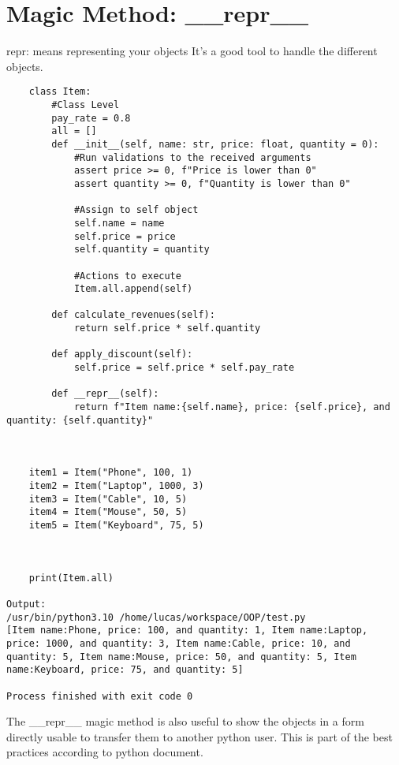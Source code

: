 \documentclass{article}
\begin{document}
\section{Magic Method: \_\_repr\_\_}
repr: means representing your objects
It's a good tool to handle the different objects.
\begin{lstlisting}
	class Item:
		#Class Level
		pay_rate = 0.8
		all = []
		def __init__(self, name: str, price: float, quantity = 0):
			#Run validations to the received arguments
			assert price >= 0, f"Price is lower than 0"
			assert quantity >= 0, f"Quantity is lower than 0"
			
			#Assign to self object
			self.name = name
			self.price = price
			self.quantity = quantity
			
			#Actions to execute
			Item.all.append(self)
			
		def calculate_revenues(self):
			return self.price * self.quantity
			
		def apply_discount(self):
			self.price = self.price * self.pay_rate
			
		def __repr__(self):
			return f"Item name:{self.name}, price: {self.price}, and quantity: {self.quantity}"
			
	
	
	item1 = Item("Phone", 100, 1)
	item2 = Item("Laptop", 1000, 3)
	item3 = Item("Cable", 10, 5)
	item4 = Item("Mouse", 50, 5)
	item5 = Item("Keyboard", 75, 5)
	
	
	
	print(Item.all)
	
Output:
/usr/bin/python3.10 /home/lucas/workspace/OOP/test.py 
[Item name:Phone, price: 100, and quantity: 1, Item name:Laptop, price: 1000, and quantity: 3, Item name:Cable, price: 10, and quantity: 5, Item name:Mouse, price: 50, and quantity: 5, Item name:Keyboard, price: 75, and quantity: 5]

Process finished with exit code 0
\end{lstlisting}

The \_\_repr\_\_ magic method is also useful to show the objects in a form directly usable to transfer them to another python user. This is part of the best practices according to python document.
\end{document}
